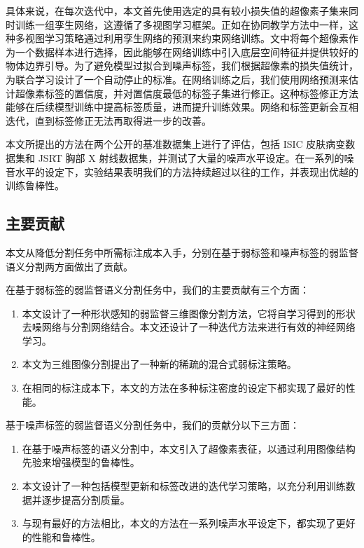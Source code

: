 具体来说，在每次迭代中，本文首先使用选定的具有较小损失值的超像素子集来同时训练一组孪生网络，这遵循了多视图学习框架\citep{Han2018CoteachingRT,Wei2020CombatingNL}。正如在协同教学方法中一样，这种多视图学习策略通过利用孪生网络的预测来约束网络训练。文中将每个超像素作为一个数据样本进行选择，因此能够在网络训练中引入底层空间特征并提供较好的物体边界引导。为了避免模型过拟合到噪声标签，我们根据超像素的损失值统计，为联合学习设计了一个自动停止的标准。在网络训练之后，我们使用网络预测来估计超像素标签的置信度，并对置信度最低的标签子集进行修正。这种标签修正方法能够在后续模型训练中提高标签质量，进而提升训练效果。网络和标签更新会互相迭代，直到标签修正无法再取得进一步的改善。

本文所提出的方法在两个公开的基准数据集上进行了评估，包括 ISIC 皮肤病变数据集\citep{Gutman2018SkinLA}和 JSRT 胸部 X 射线数据集\citep{Ginneken2006SegmentationOA,Shiraishi2000DevelopmentOA}，并测试了大量的噪声水平设定。在一系列的噪音水平的设定下，实验结果表明我们的方法持续超过以往的工作，并表现出优越的训练鲁棒性。

\subsection{主要贡献}
本文从降低分割任务中所需标注成本入手，分别在基于弱标签和噪声标签的弱监督语义分割两方面做出了贡献。

在基于弱标签的弱监督语义分割任务中，我们的主要贡献有三个方面：
\begin{enumerate}
\item 本文设计了一种形状感知的弱监督三维图像分割方法，它将自学习得到的形状去噪网络与分割网络结合。本文还设计了一种迭代方法来进行有效的神经网络学习。
\item 本文为三维图像分割提出了一种新的稀疏的混合式弱标注策略。
\item 在相同的标注成本下，本文的方法在多种标注密度的设定下都实现了最好的性能。
\end{enumerate}


基于噪声标签的弱监督语义分割任务中，我们的贡献分以下三方面：
\begin{enumerate}
    \item 在基于噪声标签的语义分割中，本文引入了超像素表征，以通过利用图像结构先验来增强模型的鲁棒性。
    \item 本文设计了一种包括模型更新和标签改进的迭代学习策略，以充分利用训练数据并逐步提高分割质量。
    \item 与现有最好的方法相比，本文的方法在一系列噪声水平设定下，都实现了更好的性能和鲁棒性。
\end{enumerate}

